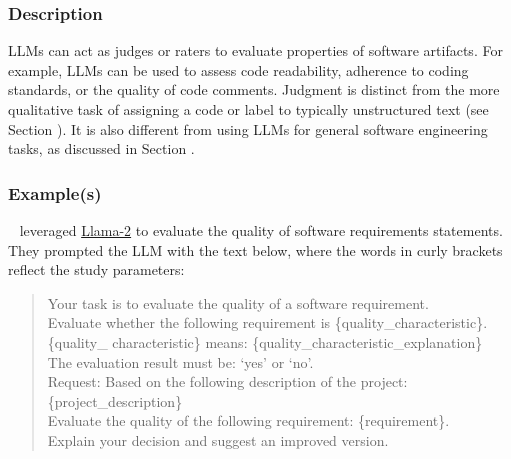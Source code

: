 \subsubsection{Description}

LLMs can act as judges or raters to evaluate properties of software artifacts.
For example, LLMs can be used to assess code readability, adherence to coding standards, or the quality of code comments.
Judgment is distinct from the more qualitative task of assigning a code or label to typically unstructured text (see Section \annotators).
It is also different from using LLMs for general software engineering tasks, as discussed in Section \llmsforresearcher.

\subsubsection{Example(s)}

\citeauthor{DBLP:conf/re/LubosFTGMEL24}~\cite{DBLP:conf/re/LubosFTGMEL24} leveraged \href{https://www.llama.com/llama2/}{Llama-2} to evaluate the quality of software requirements statements. 
They prompted the LLM with the text below, where the words in curly brackets reflect the study parameters:

\begin{quote}
\small
Your task is to evaluate the quality of a software requirement.\\
Evaluate whether the following requirement is \{quality\_characteristic\}. \\
\{quality\_ characteristic\} means: \{quality\_characteristic\_explanation\}\\
The evaluation result must be: `yes' or `no'.\\
Request: Based on the following description of the project:
\{project\_description\}\\
Evaluate the quality of the following requirement: \{requirement\}.\\
Explain your decision and suggest an improved version.\\
\end{quote}

